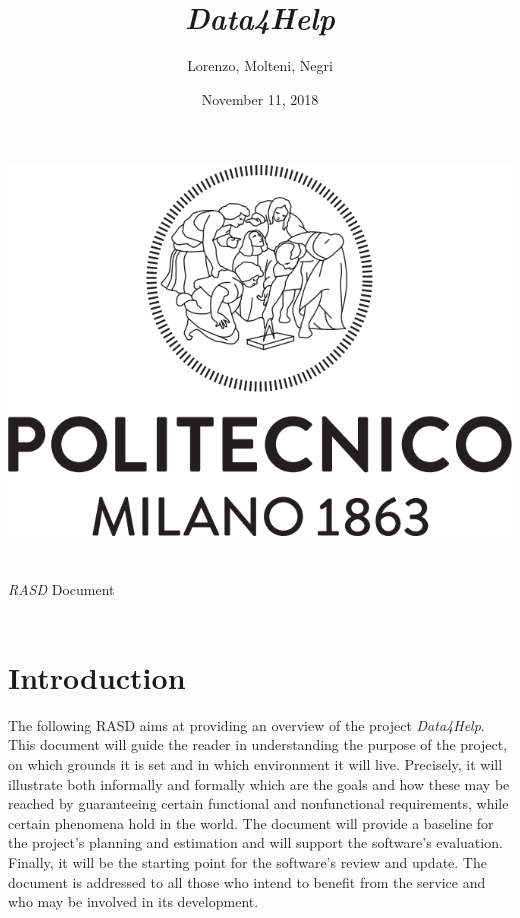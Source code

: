 \documentclass[titlepage]{article}
\title{{\Huge {\it Data4Help}}}
\author{Lorenzo, Molteni, Negri}
\date{November 11, 2018}
\begin{document}
\makeatletter
    \begin{titlepage}
        \begin{center}
            \includegraphics[width=\linewidth]{logo.png}\\[20ex]
            {\huge  \@title }\\[2ex] 
            {\LARGE  \@author}\\[3ex] 
            {\LARGE {\it RASD} Document}\\[3ex]
            {\large \@date}\\[5ex]
        \end{center}
    \end{titlepage}
\makeatother
\thispagestyle{empty}
\newpage

\thispagestyle{empty}
\newpage


	
\pagebreak
\tableofcontents{}
\pagebreak


\section{Introduction}
The following RASD aims at providing an overview of the project {\it Data4Help}. This document will guide the reader in understanding the purpose of the project, on which grounds it is set and in which environment it will live. Precisely, it will illustrate both informally and formally which are the goals and how these may be reached by guaranteeing certain functional and nonfunctional requirements, while certain phenomena hold in the world.
The document will provide a baseline for the project’s planning and estimation and will support the software’s evaluation. 
Finally, it will be the starting point for the software’s review and update.
The document is addressed to all those who intend to benefit from the service and who may be involved in its development. 
\end{document}
